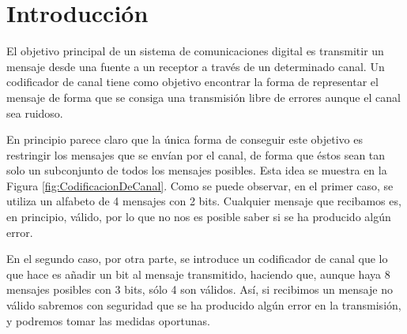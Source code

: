 \documentclass[es,apuntes]{uah}
\begin{document}

\maketitle


\section{Introducción}

El objetivo principal de un sistema de comunicaciones digital es transmitir un mensaje desde una fuente a un receptor a través de un determinado canal. Un codificador de canal tiene como objetivo encontrar la forma de representar el mensaje de forma que se consiga una transmisión libre de errores aunque el canal sea ruidoso. 

En principio parece claro que la única forma de conseguir este objetivo es restringir los mensajes que se envían por el canal, de forma que éstos sean tan solo un subconjunto de todos los mensajes posibles. Esta idea se muestra en la Figura \ref{fig:CodificacionDeCanal}. Como se puede observar, en el primer caso, se utiliza un alfabeto de 4 mensajes con 2 bits. Cualquier mensaje que recibamos es, en principio, válido, por lo que no nos es posible saber si se ha producido algún error. 

En el segundo caso, por otra parte, se introduce un codificador de canal que lo que hace es añadir un bit al mensaje transmitido, haciendo que, aunque haya 8 mensajes posibles con 3 bits, sólo 4 son válidos. Así, si recibimos un mensaje no válido sabremos con seguridad que se ha producido algún error en la transmisión, y podremos tomar las medidas oportunas. 
\end{document}
